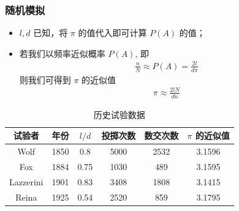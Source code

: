 \documentclass[Prob-All.tex]{subfiles}
\begin{document}
	\begin{frame}
		\frametitle{随机模拟}
		\vspace{-0.2cm}
		\begin{itemize}
			\item $l,d$ 已知，将 $\pi$ 的值代入即可计算 $P (A)$ 的值；
			\item 若我们以频率近似概率 $P (A)$, 即
			\begin{eqnarray*}
				\frac{n}{N}\approx P(A)=\frac{2l}{d\pi}
			\end{eqnarray*}
			则我们可得到 $\pi$ 的近似值
			\begin{eqnarray*}
				\pi\approx \frac{2lN}{dn}
			\end{eqnarray*}
		\end{itemize}
		\vspace{-0.5cm}
		\pause
		\begin{table}
			\centering
			\caption{历史试验数据}
			\begin{tabular}{|c|c|c|c|c|c|}
				\hline
				\rowcolor{blue!50}
				试验者 & 年份  &$l/d$ & 投掷次数 & 数交次数 &$\pi$ 的近似值 \\
				\hline
				Wolf & 1850 & 0.8  & 5000 &  2532 &3.1596\\
				Fox  & 1884 & 0.75  &1030 &  489  &3.1595\\
				Lazzerini & 1901 & 0.83  &3408 &  1808 &3.1415\\
				Reina & 1925 & 0.54  & 2520 &  859 &3.1795\\
				\hline
			\end{tabular}
		\end{table}
	\end{frame}
\end{document}
